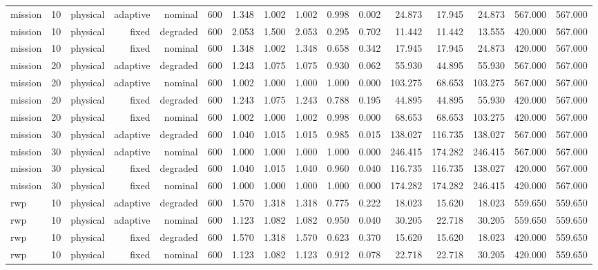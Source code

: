 \begin{tabular}{lrrrrrrrrrrrrrrr}
mission & 10 & physical & adaptive & nominal & 600 & 1.348 & 1.002 & 1.002 & 0.998 & 0.002 & 24.873 & 17.945 & 24.873 & 567.000 & 567.000 \\
mission & 10 & physical & fixed & degraded & 600 & 2.053 & 1.500 & 2.053 & 0.295 & 0.702 & 11.442 & 11.442 & 13.555 & 420.000 & 567.000 \\
mission & 10 & physical & fixed & nominal & 600 & 1.348 & 1.002 & 1.348 & 0.658 & 0.342 & 17.945 & 17.945 & 24.873 & 420.000 & 567.000 \\
mission & 20 & physical & adaptive & degraded & 600 & 1.243 & 1.075 & 1.075 & 0.930 & 0.062 & 55.930 & 44.895 & 55.930 & 567.000 & 567.000 \\
mission & 20 & physical & adaptive & nominal & 600 & 1.002 & 1.000 & 1.000 & 1.000 & 0.000 & 103.275 & 68.653 & 103.275 & 567.000 & 567.000 \\
mission & 20 & physical & fixed & degraded & 600 & 1.243 & 1.075 & 1.243 & 0.788 & 0.195 & 44.895 & 44.895 & 55.930 & 420.000 & 567.000 \\
mission & 20 & physical & fixed & nominal & 600 & 1.002 & 1.000 & 1.002 & 0.998 & 0.000 & 68.653 & 68.653 & 103.275 & 420.000 & 567.000 \\
mission & 30 & physical & adaptive & degraded & 600 & 1.040 & 1.015 & 1.015 & 0.985 & 0.015 & 138.027 & 116.735 & 138.027 & 567.000 & 567.000 \\
mission & 30 & physical & adaptive & nominal & 600 & 1.000 & 1.000 & 1.000 & 1.000 & 0.000 & 246.415 & 174.282 & 246.415 & 567.000 & 567.000 \\
mission & 30 & physical & fixed & degraded & 600 & 1.040 & 1.015 & 1.040 & 0.960 & 0.040 & 116.735 & 116.735 & 138.027 & 420.000 & 567.000 \\
mission & 30 & physical & fixed & nominal & 600 & 1.000 & 1.000 & 1.000 & 1.000 & 0.000 & 174.282 & 174.282 & 246.415 & 420.000 & 567.000 \\
rwp & 10 & physical & adaptive & degraded & 600 & 1.570 & 1.318 & 1.318 & 0.775 & 0.222 & 18.023 & 15.620 & 18.023 & 559.650 & 559.650 \\
rwp & 10 & physical & adaptive & nominal & 600 & 1.123 & 1.082 & 1.082 & 0.950 & 0.040 & 30.205 & 22.718 & 30.205 & 559.650 & 559.650 \\
rwp & 10 & physical & fixed & degraded & 600 & 1.570 & 1.318 & 1.570 & 0.623 & 0.370 & 15.620 & 15.620 & 18.023 & 420.000 & 559.650 \\
rwp & 10 & physical & fixed & nominal & 600 & 1.123 & 1.082 & 1.123 & 0.912 & 0.078 & 22.718 & 22.718 & 30.205 & 420.000 & 559.650 \\

\end{tabular}
